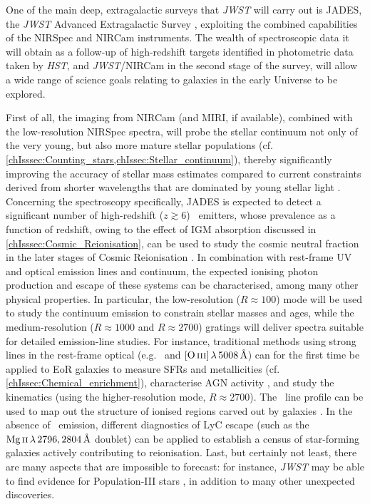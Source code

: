 One of the main deep, extragalactic surveys that \textit{JWST} will carry out is JADES, the \textit{JWST} Advanced Extragalactic Survey \citep[e.g.][]{2018ApJS..236...33W}, exploiting the combined capabilities of the NIRSpec and NIRCam instruments. The wealth of spectroscopic data it will obtain as a follow-up of high-redshift targets identified in photometric data taken by \textit{HST}, and \textit{JWST}/NIRCam in the second stage of the survey, will allow a wide range of science goals relating to galaxies in the early Universe to be explored.

First of all, the imaging from NIRCam (and MIRI, if available), combined with the low-resolution NIRSpec spectra, will probe the stellar continuum not only of the very young, but also more mature stellar populations (cf. \cref{chIsssec:Counting_stars,chIssec:Stellar_continuum}), thereby significantly improving the accuracy of stellar mass estimates compared to current constraints derived from shorter wavelengths that are dominated by young stellar light \citep[e.g.][]{2022arXiv220803281T}. Concerning the spectroscopy specifically, JADES is expected to detect a significant number of high-redshift ($z \gtrsim 6$) \lya\ emitters, whose prevalence as a function of redshift, owing to the effect of IGM absorption discussed in \cref{chIsssec:Cosmic_Reionisation}, can be used to study the cosmic neutral fraction in the later stages of Cosmic Reionisation \citep{2010MNRAS.408.1628S, 2014ApJ...793..113P, 2014MNRAS.443.2831C, 2018ApJ...856....2M, 2019MNRAS.489.2669M, 2022MNRAS.512.5960M}. In combination with rest-frame UV and optical emission lines and continuum, the expected ionising photon production and escape of these systems can be characterised, among many other physical properties. In particular, the low-resolution ($R \approx 100$) mode will be used to study the continuum emission to constrain stellar masses and ages, while the medium-resolution ($R \approx 1000$ and $R \approx 2700$) gratings will deliver spectra suitable for detailed emission-line studies. For instance, traditional methods using strong lines in the rest-frame optical (e.g. \Halpha\ and $\OIIIf \, \lambda \, 5008 \, \Angstrom$) can for the first time be applied to EoR galaxies to measure SFRs and metallicities (cf. \cref{chIssec:Chemical_enrichment}), characterise AGN activity \citep[\cref{chIssec:Nebular_emission_and_emission-line_diagnostics}; see also][]{2022arXiv220807467B}, and study the kinematics (using the higher-resolution mode, $R \approx 2700$). The \lya\ line profile can be used to map out the structure of ionised regions carved out by galaxies \citep[``ionised bubbles'';][]{2020MNRAS.499.1395M}. In the absence of \lya\ emission, different diagnostics of LyC escape (such as the $\MgII \, \lambda \, 2796, 2804 \, \Angstrom$ doublet) can be applied to establish a census of star-forming galaxies actively contributing to reionisation. Last, but certainly not least, there are many aspects that are impossible to forecast: for instance, \textit{JWST} may be able to find evidence for Population-III stars \citep[e.g.][]{2022MNRAS.513.5134N}, in addition to many other unexpected discoveries.

